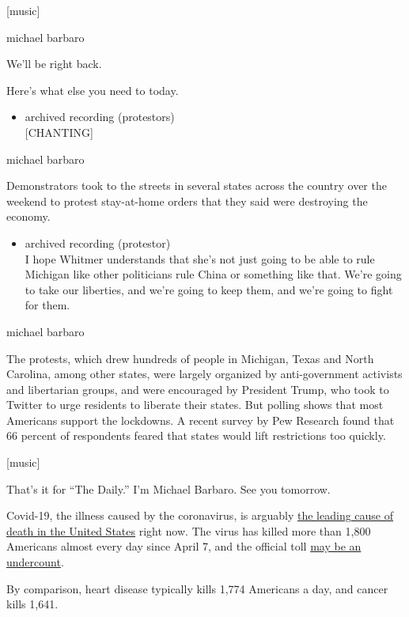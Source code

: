 {[}music{]}

michael barbaro

We'll be right back.

Here's what else you need to today.

\begin{itemize}
\tightlist
\item
  archived recording (protestors)\\
  {[}CHANTING{]}
\end{itemize}

michael barbaro

Demonstrators took to the streets in several states across the country
over the weekend to protest stay-at-home orders that they said were
destroying the economy.

\begin{itemize}
\tightlist
\item
  archived recording (protestor)\\
  I hope Whitmer understands that she's not just going to be able to
  rule Michigan like other politicians rule China or something like
  that. We're going to take our liberties, and we're going to keep them,
  and we're going to fight for them.
\end{itemize}

michael barbaro

The protests, which drew hundreds of people in Michigan, Texas and North
Carolina, among other states, were largely organized by anti-government
activists and libertarian groups, and were encouraged by President
Trump, who took to Twitter to urge residents to liberate their states.
But polling shows that most Americans support the lockdowns. A recent
survey by Pew Research found that 66 percent of respondents feared that
states would lift restrictions too quickly.

{[}music{]}

That's it for ``The Daily.'' I'm Michael Barbaro. See you tomorrow.

Covid-19, the illness caused by the coronavirus, is arguably
\href{https://public.flourish.studio/visualisation/1830480/}{the leading
cause of death in the United States} right now. The virus has killed
more than 1,800 Americans almost every day since April 7, and the
official toll
\href{https://www.nytimes3xbfgragh.onion/2020/04/10/nyregion/new-york-coronavirus-death-count.html}{may
be an undercount}.

By comparison, heart disease typically kills 1,774 Americans a day, and
cancer kills 1,641.

